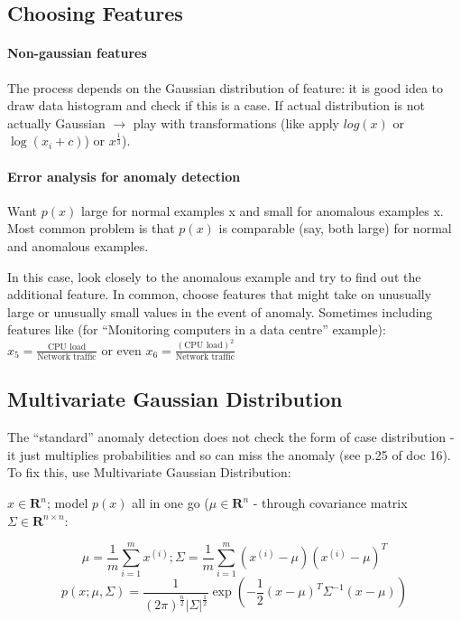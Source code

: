 \documentclass{scrartcl}
\begin{document}
\subsection{Choosing Features}
\label{sec:15-6}

\paragraph{Non-gaussian features}

The process depends on the Gaussian distribution of feature: it is
good idea to draw data histogram and check if this is a case. If
actual distribution is not actually Gaussian $\to$ play with
transformations (like apply $log(x)$ or $\log(x_i + c)$) or
$x^{\frac{1}{3}}$).

\paragraph{Error analysis for anomaly detection}

Want $p(x)$ large for normal examples x and small for anomalous
examples x. Most common problem is that $p(x)$ is comparable (say,
both large) for normal and anomalous examples.

In this case, look closely to the anomalous example and try to find
out the additional feature. In common, choose features that might take
on unusually large or unusually small values in the event of anomaly.
Sometimes including features like (for ``Monitoring computers in a
data centre'' example): $x_5 = \frac{\textrm{CPU
    load}}{\textrm{Network traffic}}$ or even $x_6 =
\frac{(\textrm{CPU load})^2}{\textrm{Network traffic}}$

\subsection{Multivariate Gaussian Distribution}
\label{sec:15-7}

The ``standard'' anomaly detection does not check the form of case
distribution - it just multiplies probabilities and so can miss the
anomaly (see p.25 of doc 16). To fix this, use Multivariate Gaussian
Distribution:

$x \in \mathbf{R}^n$; model $p(x)$ all in one go ($\mu \in
\mathbf{R}^n$ - through covariance matrix $\Sigma \in \mathbf{R}^{n
  \times n} $:

\[ \mu = \frac{1}{m} \sum \limits_{i=1}^{m} x^{(i)}; \Sigma =
\frac{1}{m}\sum \limits_{i=1}^{m}(x^{(i)}-\mu)(x^{(i)}- \mu)^T \]
\[p(x; \mu, \Sigma) = \frac{1}{(2 \pi)^{\frac{n}{2}}
  |\Sigma|^{\frac{1}{2}}} \exp(-\frac{1}{2}(x - \mu)^T
\Sigma^{-1}(x-\mu))\]
\end{document}
